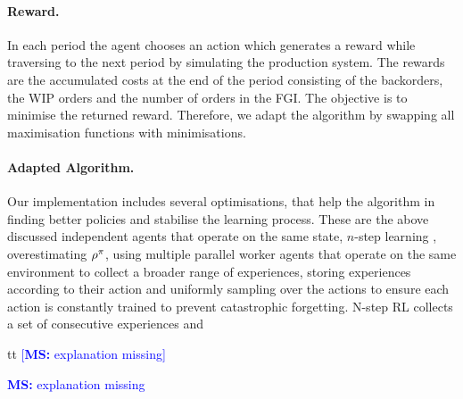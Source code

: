 \documentclass[envcountsame]{llncs}
\newcommand\MS[2][r]{\ifx t#1 \textcolor{blue}{[\textbf{MS:} #2]}
  \else \begin{center}\textcolor{blue}{\textbf{MS:} #2} \end{center} \fi}
\begin{document}


\paragraph*{Reward.}
In each period the agent chooses an action which generates a reward while traversing to the next
period by simulating the production system. The rewards are the accumulated costs at the end of the
period consisting of the backorders, the WIP orders and the number of orders in the FGI. The
objective is to minimise the returned reward. Therefore, we adapt the algorithm by swapping all
maximisation functions with minimisations.

\paragraph*{Adapted Algorithm.}
Our implementation includes several optimisations, that help the algorithm in finding better
policies and stabilise the learning process. These are the above discussed independent agents that
operate on the same state, \(n\)-step learning \citep{mnih2016asynchronous}, overestimating
\(\rho^{\pi}\), using multiple parallel worker agents that operate on the same environment to
collect a broader range of experiences, storing experiences according to their action and uniformly
sampling over the actions to ensure each action is constantly trained to prevent catastrophic
forgetting.
%
N-step RL collects a set of consecutive experiences and

\MS[t]{explanation
  missing}


\end{document}
